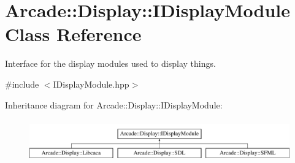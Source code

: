\hypertarget{classArcade_1_1Display_1_1IDisplayModule}{}\section{Arcade\+::Display\+::I\+Display\+Module Class Reference}
\label{classArcade_1_1Display_1_1IDisplayModule}


Interface for the display modules used to display things.  




{\ttfamily \#include $<$I\+Display\+Module.\+hpp$>$}

Inheritance diagram for Arcade\+::Display\+::I\+Display\+Module\+:\begin{figure}[H]
\begin{center}
\leavevmode
\includegraphics[height=1.839080cm]{classArcade_1_1Display_1_1IDisplayModule}
\end{center}
\end{figure}
